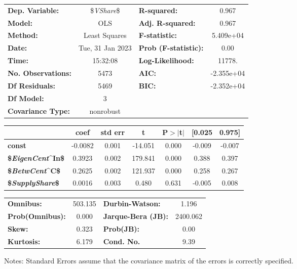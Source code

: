 \begin{center}
\begin{tabular}{lclc}
\toprule
\textbf{Dep. Variable:}           & \${\it VShare}\$ & \textbf{  R-squared:         } &     0.967   \\
\textbf{Model:}                   &       OLS        & \textbf{  Adj. R-squared:    } &     0.967   \\
\textbf{Method:}                  &  Least Squares   & \textbf{  F-statistic:       } & 5.409e+04   \\
\textbf{Date:}                    & Tue, 31 Jan 2023 & \textbf{  Prob (F-statistic):} &     0.00    \\
\textbf{Time:}                    &     15:32:08     & \textbf{  Log-Likelihood:    } &    11778.   \\
\textbf{No. Observations:}        &        5473      & \textbf{  AIC:               } & -2.355e+04  \\
\textbf{Df Residuals:}            &        5469      & \textbf{  BIC:               } & -2.352e+04  \\
\textbf{Df Model:}                &           3      & \textbf{                     } &             \\
\textbf{Covariance Type:}         &    nonrobust     & \textbf{                     } &             \\
\bottomrule
\end{tabular}
\begin{tabular}{lcccccc}
                                  & \textbf{coef} & \textbf{std err} & \textbf{t} & \textbf{P$> |$t$|$} & \textbf{[0.025} & \textbf{0.975]}  \\
\midrule
\textbf{const}                    &      -0.0082  &        0.001     &   -14.051  &         0.000        &       -0.009    &       -0.007     \\
\textbf{\${\it EigenCent}^{In}\$} &       0.3923  &        0.002     &   179.841  &         0.000        &        0.388    &        0.397     \\
\textbf{\${\it BetwCent}^C\$}     &       0.2625  &        0.002     &   121.937  &         0.000        &        0.258    &        0.267     \\
\textbf{\${\it SupplyShare}\$}    &       0.0016  &        0.003     &     0.480  &         0.631        &       -0.005    &        0.008     \\
\bottomrule
\end{tabular}
\begin{tabular}{lclc}
\textbf{Omnibus:}       & 503.135 & \textbf{  Durbin-Watson:     } &    1.196  \\
\textbf{Prob(Omnibus):} &   0.000 & \textbf{  Jarque-Bera (JB):  } & 2400.062  \\
\textbf{Skew:}          &   0.323 & \textbf{  Prob(JB):          } &     0.00  \\
\textbf{Kurtosis:}      &   6.179 & \textbf{  Cond. No.          } &     9.39  \\
\bottomrule
\end{tabular}
\end{center}

Notes: \newline
 [1] Standard Errors assume that the covariance matrix of the errors is correctly specified.